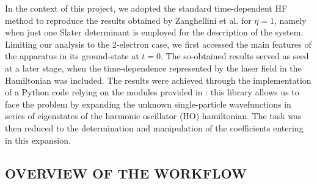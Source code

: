 In the context of this project, we adopted the standard time-dependent HF method to reproduce the results obtained by Zanghellini et al. for $\eta=1$, namely when just one Slater determinant is employed for the description of the system. Limiting our analysis to the 2-electron case, we first accessed the main features of the apparatus in its ground-state at $t=0$. The so-obtained results served as seed at a later stage, when the time-dependence represented by the laser field in the Hamiltonian was included. The results were achieved through the implementation of a Python code relying on the modules provided in \cite{gitOyvind}: this library allows us to face the problem by expanding the unknown single-particle wavefunctions in series of eigenstates of the harmonic oscillator (HO) hamiltonian. The task was then reduced to the determination and manipulation of the coefficients entering in this expansion.

\subsection{OVERVIEW OF THE WORKFLOW}
